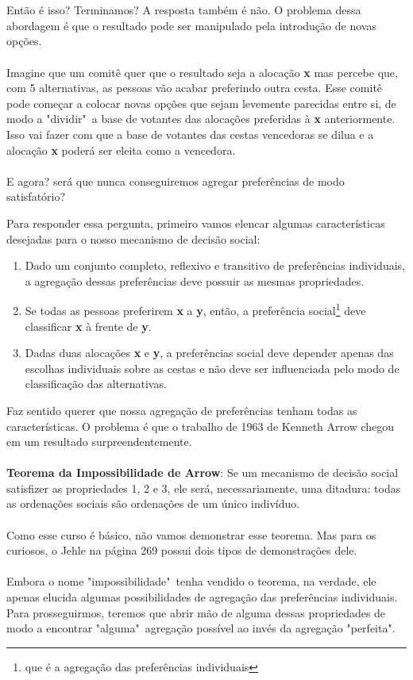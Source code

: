 \documentclass[a4paper,11pt,oneside]{book}
\theoremstyle{definition}
\theoremstyle{break}
\begin{document}
\\
\\
Então é isso? Terminamos? A resposta também é não. O problema dessa abordagem é que o resultado pode ser manipulado pela introdução de novas opções. 
\\
\\
Imagine que um comitê quer que o resultado seja a alocação \textbf{x} mas percebe que, com 5 alternativas, as pessoas vão acabar preferindo outra cesta. Esse comitê pode começar a colocar novas opções que sejam levemente parecidas entre si, de modo a "dividir"\ a base de votantes das alocações preferidas à \textbf{x} anteriormente. Isso vai fazer com que a base de votantes das cestas vencedoras se dilua e a alocação \textbf{x} poderá ser eleita como a vencedora.
\\
\\
E agora? será que nunca conseguiremos agregar preferências de modo satisfatório?

\newpage

Para responder essa pergunta, primeiro vamos elencar algumas características desejadas para o nosso mecanismo de decisão social:
\begin{enumerate}
	\item Dado um conjunto completo, reflexivo e transitivo de preferências individuais, a agregação dessas preferências deve possuir as mesmas propriedades.
	\item Se todas as pessoas preferirem \textbf{x} a \textbf{y}, então, a preferência social\footnote{que é a agregação das preferências individuais} deve classificar \textbf{x} à frente de \textbf{y}.
	\item Dadas duas alocações \textbf{x} e \textbf{y}, a preferências social deve depender apenas das escolhas individuais sobre as cestas e não deve ser influenciada pelo modo de classificação das alternativas.
\end{enumerate}

Faz sentido querer que nossa agregação de preferências tenham todas as características. O problema é que o trabalho de 1963 de Kenneth Arrow chegou em um resultado surpreendentemente.
\\
\\
\textbf{Teorema da Impossibilidade de Arrow}: Se um mecanismo de decisão social satisfizer as propriedades 1, 2 e 3, ele será, necessariamente, uma ditadura: todas as ordenações sociais são ordenações de um único indivíduo.
\\
\\
Como esse curso é básico, não vamos demonstrar esse teorema. Mas para os curiosos, o Jehle na página 269 possui dois tipos de demonstrações dele.
\\
\\
Embora o nome "impossibilidade"\ tenha vendido o teorema, na verdade, ele apenas elucida algumas possibilidades de agregação das preferências individuais. Para prosseguirmos, teremos que abrir mão de alguma dessas propriedades de modo a encontrar "alguma"\ agregação possível ao invés da agregação "perfeita".
\end{document}
